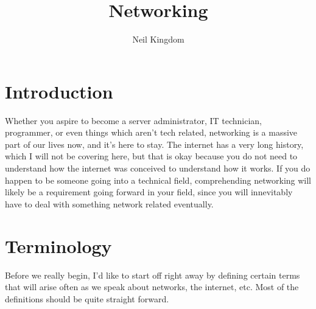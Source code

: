 \documentclass{article}
\title{Networking}
\author{Neil Kingdom}
\begin{document}
\begin{titlingpage}

\maketitle

\end{titlingpage}

\newpage

\tableofcontents

\newpage

\section{Introduction}

Whether you aspire to become a server administrator, IT technician, programmer, or even things which aren’t
tech related, networking is a massive part of our lives now, and it’s here to stay. The internet has a very
long history, which I will not be covering here, but that is okay because you do not need to understand how
the internet was conceived to understand how it works. If you do happen to be someone going into a technical
field, comprehending networking will likely be a requirement going forward in your field, since you will
innevitably have to deal with something network related eventually.

\section{Terminology}

Before we really begin, I’d like to start off right away by defining certain terms that will arise often as we
speak about networks, the internet, etc. Most of the definitions should be quite straight forward.
\end{document}
